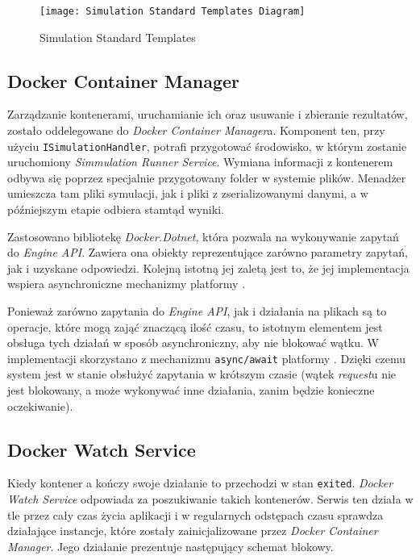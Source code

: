 \begin{figure}[H]
	\texttt{[image: Simulation Standard Templates Diagram]}
	\caption{Simulation Standard Templates}
	\label{fig:simulationStandardTemplates}
\end{figure}

\subsection{Docker Container Manager}
\label{sec:dockerContainerManager}

\par Zarządzanie kontenerami, uruchamianie ich oraz usuwanie i zbieranie rezultatów, zostało oddelegowane do \emph{Docker Container Manager}a. Komponent ten, przy użyciu \texttt{ISimulationHandler}, potrafi przygotować środowisko, w którym zostanie uruchomiony \emph{Simmulation Runner Service}. Wymiana informacji z kontenerem odbywa się poprzez specjalnie przygotowany folder w systemie plików. Menadżer umieszcza tam pliki symulacji, jak i pliki z zserializowanymi danymi, a w późniejszym etapie odbiera stamtąd wyniki.

\par Zastosowano bibliotekę \emph{Docker.Dotnet}, która pozwala na wykonywanie zapytań do \emph{\docker{} Engine API}. Zawiera ona obiekty reprezentujące zarówno parametry zapytań, jak i uzyskane odpowiedzi. Kolejną istotną jej zaletą jest to, że jej implementacja wspiera asynchroniczne mechanizmy platformy \emph{\dotnet{}}.

\par Ponieważ zarówno zapytania do \emph{\docker{} Engine API}, jak i działania na plikach są to operacje, które mogą zająć znaczącą ilość czasu, to istotnym elementem jest obsługa tych działań w sposób asynchroniczny, aby nie blokować wątku. W implementacji skorzystano z mechanizmu \texttt{async/await} platformy \emph{\dotnet{}}. Dzięki czemu system jest w stanie obsłużyć zapytania w krótszym czasie (wątek \emph{request}u nie jest blokowany, a może wykonywać inne działania, zanim będzie konieczne oczekiwanie).

\subsection{Docker Watch Service}
\label{sec:dockerWatchService}

\par Kiedy kontener \emph{\docker{}}a kończy swoje działanie to przechodzi w stan \texttt{exited}. \emph{Docker Watch Service} odpowiada za poszukiwanie takich kontenerów. Serwis ten działa w tle przez cały czas życia aplikacji i w regularnych odstępach czasu sprawdza działające instancje, które zostały zainicjalizowane przez \emph{Docker Container Manager}. Jego działanie prezentuje następujący schemat blokowy.

